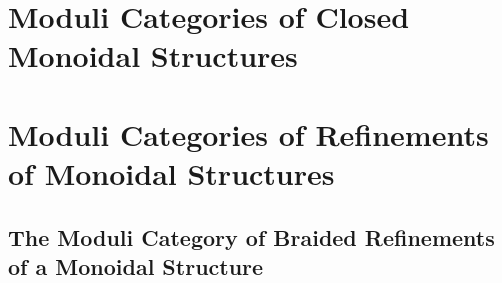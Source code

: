 \section{Moduli Categories of Closed Monoidal Structures}\label{section-moduli-categories-of-closed-monoidal-structures}
\section{Moduli Categories of Refinements of Monoidal Structures}\label{section-moduli-categories-of-refinements-of-monoidal-structures}
\subsection{The Moduli Category of Braided Refinements of a Monoidal Structure}\label{subsection-the-moduli-category-of-braided-refinements-of-a-monoidal-structure}
\begin{appendices}

\end{appendices}

